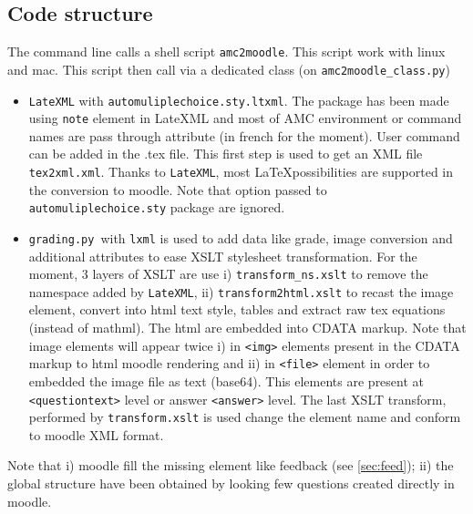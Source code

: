 \documentclass[a4paper]{article}
\newcommand{\elem}[1]{\texttt{<#1>}}
\newcommand{\py}{\texttt{grading.py}~}
\begin{document}
\subsection{Code structure}
The command line calls a shell script \texttt{amc2moodle}. This script work with linux and mac. This script then call via a dedicated class (on \texttt{amc2moodle\_class.py})
\begin{itemize}
\item \texttt{LateXML} with \texttt{automuliplechoice.sty.ltxml}. The package has been made using \texttt{note} element in LateXML and most of  AMC environment or command names are pass through attribute (in french for the moment). User command can be added in the .tex file. This first step is used to get an XML file \texttt{tex2xml.xml}. Thanks to \texttt{LateXML}, most \LaTeX possibilities are supported in the conversion to moodle. Note that option passed to \texttt{automuliplechoice.sty} package are ignored.

\item \py with \texttt{lxml} is used to add data like grade, image conversion and additional attributes to ease XSLT stylesheet transformation. For the moment, 3 layers of XSLT are use i) \texttt{transform\_ns.xslt} to remove the namespace added by \texttt{LateXML}, ii) \texttt{transform2html.xslt} to recast the image element, convert into html text style, tables and extract raw tex equations (instead of mathml). The html are embedded into CDATA markup.
Note that image elements will appear twice i) in \elem{img} elements present in the CDATA markup to html moodle rendering and ii) in \elem{file} element in order to embedded the image file as text (base64). This elements are present at \elem{questiontext} level or answer \elem{answer} level.
The last XSLT transform, performed by \texttt{transform.xslt} is used change the element name and conform to moodle XML format.
\end{itemize}
Note that i) moodle fill the missing element like feedback (see \ref{sec:feed}); ii) the global structure have been obtained by looking few questions created directly in moodle. 
% 
\end{document}
